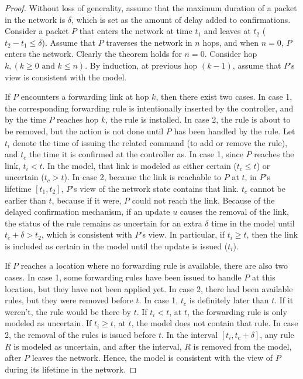   \vspace{-0.1in}
\begin{proof} Without loss of generality, assume that the maximum duration of a
packet in the network is $\delta$, which is set as the amount of delay added to
confirmations.  Consider a packet $P$ that enters the network at time $t_1$ and
leaves at $t_2$ ($t_2-t_1 \le \delta$).  Assume that $P$ traverses the network in
$n$ hops, and when $n=0$, $P$ enters the network.  Clearly the theorem holds for
$n=0$.  Consider hop $k, (k \ge 0\mbox{ and } k \le n)$.  By induction, at
previous hop $(k-1)$, assume that $P$'s view is consistent with the model.

If $P$ encounters a forwarding link at hop $k$, then there exist two cases.
In case 1, the corresponding forwarding rule is intentionally inserted by the
controller, and by the time $P$ reaches hop $k$, the rule is installed.  In case
2, the rule is about to be removed, but the action is not done until $P$ has been
handled by the rule.  Let $t_i$ denote the time of issuing the related command (to add or
remove the rule), and $t_c$ the time it is confirmed at the controller as.  
In case 1, since $P$ reaches the link, $t_i < t$.  In the model, that
link is modeled as either certain ($t_c \le t$) or uncertain ($t_c > t$).  In
case 2, because the link is reachable to $P$ at $t$, in $P$'s lifetime $[t_1,
t_2]$, $P$'s view of the network state contains that link.  $t_c$ cannot be
earlier than $t$, because if it were, $P$ could not reach the link.  Because of the delayed
confirmation mechanism, if an update $u$ causes the removal of the link, the
status of the rule remains as uncertain for an extra $\delta$ time in the model
until $t_c + \delta > t_2$, which is consistent with $P$'s view.  
In particular, if $t_i \ge t$, then the link is included as certain in the model
until the update is issued ($t_i$).

If $P$ reaches a location where no forwarding rule is available, there are also
two cases.  In case 1, some forwarding rules have been issued to handle $P$ at this
location, but they have not been applied yet. In case 2, there had been available rules, but
they were removed before $t$.  In case 1, $t_c$ is definitely later than $t$.
If it weren't, the rule would be there by $t$.  If $t_i < t$, at $t$, the forwarding rule
is only modeled as uncertain.  If $t_i \ge t$, at $t$, the model does not
contain that rule.  In case 2, the removal of the rules is issued before $t$.
In the interval $[t_i, t_c + \delta]$, any rule $R$ is modeled as uncertain,
and after the interval, $R$ is removed from the model, after $P$ leaves the
network.  Hence, the model is consistent with the view of $P$ during its
lifetime in the network.
\end{proof}

